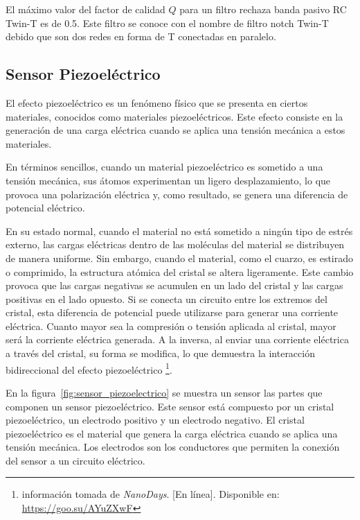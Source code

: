             El máximo valor del factor de calidad $Q$ para un filtro rechaza banda pasivo RC Twin-T es de 0.5. Este filtro se conoce con el nombre de filtro notch Twin-T debido que son dos redes en forma de T conectadas en paralelo.
        
    \subsection{Sensor Piezoeléctrico}
    
    El efecto piezoeléctrico es un fenómeno físico que se presenta en ciertos materiales, conocidos como materiales piezoeléctricos. Este efecto consiste en la generación de una carga eléctrica cuando se aplica una tensión mecánica a estos materiales.
    
    En términos sencillos, cuando un material piezoeléctrico es sometido a una tensión mecánica, sus átomos experimentan un ligero desplazamiento, lo que provoca una polarización eléctrica y, como resultado, se genera una diferencia de potencial eléctrico.

    En su estado normal, cuando el material no está sometido a ningún tipo de estrés externo, las cargas eléctricas dentro de las moléculas del material se distribuyen de manera uniforme. Sin embargo, cuando el material, como el cuarzo, es estirado o comprimido, la estructura atómica del cristal se altera ligeramente. Este cambio provoca que las cargas negativas se acumulen en un lado del cristal y las cargas positivas en el lado opuesto. Si se conecta un circuito entre los extremos del cristal, esta diferencia de potencial puede utilizarse para generar una corriente eléctrica. Cuanto mayor sea la compresión o tensión aplicada al cristal, mayor será la corriente eléctrica generada. A la inversa, al enviar una corriente eléctrica a través del cristal, su forma se modifica, lo que demuestra la interacción bidireccional del efecto piezoeléctrico \footnote{información tomada de \textit{NanoDays}. [En línea]. Disponible en: \url{https://goo.su/AYuZXwF}}.

    En la figura~\ref{fig:sensor_piezoelectrico} se muestra un sensor las partes que componen un sensor piezoeléctrico. Este sensor está compuesto por un cristal piezoeléctrico, un electrodo positivo y un electrodo negativo. El cristal piezoeléctrico es el material que genera la carga eléctrica cuando se aplica una tensión mecánica. Los electrodos son los conductores que permiten la conexión del sensor a un circuito eléctrico.

